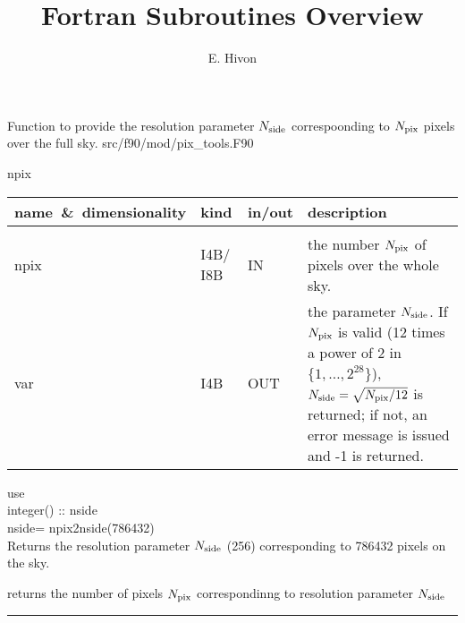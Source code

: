 

\sloppy


\title{\healpix Fortran Subroutines Overview}
 \section[npix2nside]{ }
\label{sub:npix2nside}
\author{E. Hivon}

\begin{facility}
{Function to provide the resolution parameter ${N_{\rm side}}$ correspoonding to ${N_{\rm pix}}$
pixels over the full sky. 
}
{src/f90/mod/pix\_tools.F90}
\end{facility}

\begin{f90function}
{npix}
\end{f90function}

\begin{arguments}
{
\begin{tabular}{p{0.3\hsize} p{0.05\hsize} p{0.1\hsize} p{0.45\hsize}} \hline  
\textbf{name~\&~dimensionality} & \textbf{kind} & \textbf{in/out} & \textbf{description} \\ \hline
                   &   &   &                           \\ %
npix & I4B/ I8B & IN & the number ${N_{\rm pix}}$ of pixels over the whole sky. \\
var & I4B & OUT & the parameter ${N_{\rm side}}$. If ${N_{\rm pix}}$ is valid (12 times a power of 2 in
$\{1,\ldots,2^{28}\}$), ${N_{\rm side}}=\sqrt{{N_{\rm pix}}/12}$ is returned; if not, an error message is
issued and -1 is returned.\\
\end{tabular}
}
\end{arguments}

\begin{example}
{
use  \\
integer() :: nside \\
nside= npix2nside(786432)  \\
}
{
Returns the resolution parameter ${N_{\rm side}}$ (256) corresponding to 786432 pixels
on the sky.
}
\end{example}
\begin{related}
  \begin{sulist}{} %
  \item[\htmlref{nside2npix}{sub:nside2npix}] returns the number of pixels ${N_{\rm pix}}$ correspondinng to
  resolution parameter ${N_{\rm side}}$
  \end{sulist}
\end{related}

\rule{\hsize}{2mm}

